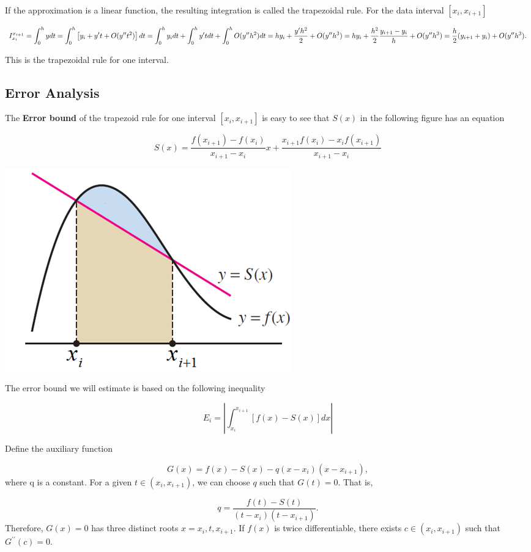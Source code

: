 \documentclass[
]{book}
\begin{document}
If the approximation is a linear function, the resulting integration is called the trapezoidal rule. For the data interval \([x_i, x_{i+1}]\)

\[
I_{x_i}^{x_{i+1}} = \int_0^h ydt = \int_0^h \left[y_i+ y^\prime t + O(y^{\prime\prime} t^2) \right]dt = \int_0^hy_idt + \int_0^hy^\prime t dt + \int_0^h O(y^{\prime\prime} h^2)dt\\
=hy_i + \frac{y^\prime h^2}{2} + O(y^{\prime\prime} h^3) = hy_i +\frac{h^2}{2}\frac{y_{i+1}-y_i}{h} +O(y^{\prime\prime} h^3) = \frac{h}{2}(y_{i+1}+y_i) + O(y^{\prime\prime} h^3).
\]

This is the trapezoidal rule for one interval.

\hfill\break

\hypertarget{error-analysis-8}{%
\subsection{Error Analysis}\label{error-analysis-8}}

The \textbf{Error bound} of the trapezoid rule for one interval \([x_i, x_{i+1}]\) is easy to see that \(S(x)\) in the following figure has an equation

\[
S(x) =  \frac{f(x_{i+1})-f(x_i)}{x_{i+1} - x_i} x + \frac{x_{i+1}f(x_{i}) - x_if(x_{i+1})}{x_{i+1} - x_i}
\]

\begin{center}\includegraphics[width=0.45\linewidth]{img12/w12-TrapezoidApproximating} \end{center}

The error bound we will estimate is based on the following inequality

\[
E_i = \left|\int_{x_i}^{x_{i+1}}\left[f(x) -  S(x)\right]dx \right|
\]

Define the auxiliary function

\[
G(x) = f(x) - S(x) - q(x-x_i)(x-x_{i+1}),
\]
where q is a constant. For a given \(t \in (x_i, x_{i+1})\), we can choose \(q\) such that \(G(t) = 0\). That is,

\[
q = \frac{f(t) - S(t)}{(t-x_i)(t-x_{i+1})}.
\]
Therefore, \(G(x) = 0\) has three distinct roots \(x = x_i, t, x_{i+1}\). If \(f(x)\) is twice differentiable, there exists \(c \in (x_i, x_{i+1})\) such that \(G^{\prime\prime}(c) = 0\).
\end{document}

